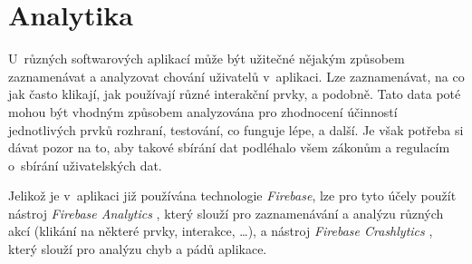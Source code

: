 \section{Analytika}

U~různých softwarových aplikací může být užitečné nějakým způsobem zaznamenávat a analyzovat chování uživatelů v~aplikaci. Lze zaznamenávat, na co jak často klikají, jak používají různé interakční prvky, a podobně. Tato data poté mohou být vhodným způsobem analyzována pro zhodnocení účinností jednotlivých prvků rozhraní, testování, co funguje lépe, a další. Je však potřeba si dávat pozor na to, aby takové sbírání dat podléhalo všem zákonům a regulacím o~sbírání uživatelských dat. 

Jelikož je v~aplikaci již používána technologie \emph{Firebase}, lze pro tyto účely použít nástroj \emph{Firebase Analytics} \cite{firebase-analytics}, který slouží pro zaznamenávání a analýzu různých akcí (klikání na některé prvky, interakce, \dots), a nástroj \emph{Firebase Crashlytics} \cite{firebase-crashlytics}, který slouží pro analýzu chyb a pádů aplikace.







































